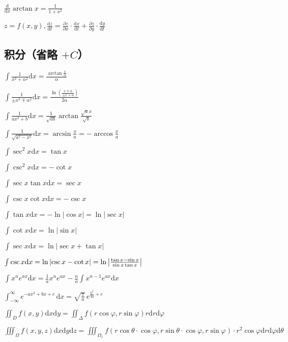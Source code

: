 \documentclass[9pt,landscape]{article}
\begin{document}
\begin{multicols}{3}
$\frac{\mathrm{d}}{\mathrm{d}x}\arctan x={\frac {1}{1+x^{2}}}$

$z=f(x,y), \frac{\mathrm{d}z}{\mathrm{d}t}=\frac{\partial z}{\partial x}\cdot\frac{\mathrm{d}x}{\mathrm{d}t}+\frac{\partial z}{\partial y}\cdot\frac{\mathrm{d}y}{\mathrm{d}t}$

\subsection{积分（省略 $+C$）}

$ \int {\frac {1}{x^{2}+\alpha ^{2}}}{\mbox{d}}x={\frac {\arctan {\frac {x}{\alpha }}}{\alpha }} $

$ \int {\frac {1}{\pm x^{2}\mp \alpha ^{2}}}{\mbox{d}}x={\frac {\ln \left({\frac {x\mp \alpha }{\pm x+\alpha }}\right)}{2\alpha }} $

$ \int {\frac {1}{ax^{2}+b}}{\mbox{d}}x={\frac {1}{\sqrt {ab}}}\arctan {\frac {{\sqrt {a}}x}{\sqrt {b}}} $

$ \int {\frac {1}{\sqrt {a^{2}-x^{2}}}}{\mbox{d}}x=\arcsin {\frac {x}{a}}=-\arccos {\frac {x}{a}} $

$ \int \sec ^{2}x{\mbox{d}}x=\tan x $

$ \int \csc ^{2}x{\mbox{d}}x=-\cot x $

$ \int \sec x\tan x{\mbox{d}}x=\sec x $

$ \int \csc x\cot x{\mbox{d}}x=-\csc x $

$ \int \tan x{\mbox{d}}x=-\ln {\left|\cos {x}\right|}=\ln {\left|\sec x\right|} $

$ \int \cot x{\mbox{d}}x=\ln {\left|\sin x\right|} $

$ \int \sec x{\mbox{d}}x=\ln {\left|\sec x+\tan x\right|} $

$ \int \csc x{\mbox{d}}x=\ln {\left|\csc x-\cot x\right|}=\ln {\left|{\tan x-\sin x \over \sin x\tan x}\right|} $

$ \int x^{n}e^{ax}{\mbox{d}}x={\frac {1}{a}}x^{n}e^{ax}-{\frac {n}{a}}\int x^{n-1}e^{ax}{\mbox{d}}x $

$ \int _{-\infty }^{\infty }e^{-ax^{2}+bx+c}\,\mathrm{d}x={\sqrt {\frac {\pi }{a}}}\,e^{{\frac {b^{2}}{4a}}+c} $

$ \iint_{D} f(x, y)\mathrm{d}x\mathrm{d}y=\iint_{\Delta}f(r\cos \varphi, r\sin\varphi){r}\mathrm{d}r\mathrm{d}\varphi$

$ \iiint_{\Omega} f(x, y, z) \mathrm{d}x\mathrm{d}y\mathrm{d}z=\iiint_{\Omega_1}f(r\cos\theta\cdot\cos\varphi, r\sin\theta\cdot\cos\varphi, r\sin\varphi)\cdot r^2\cos\varphi\mathrm{d}r\mathrm{d}\varphi\mathrm{d}\theta$


\end{multicols}
\end{document}
